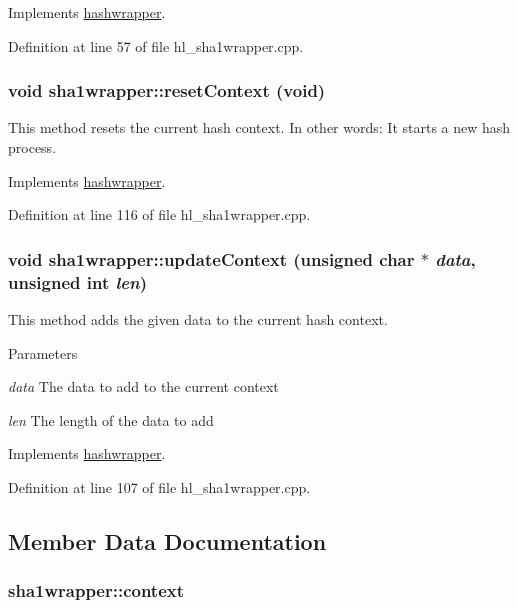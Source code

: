 Implements \hyperlink{classhashwrapper_a53f97c06885ed2b1fa255759a957a782}{hashwrapper}.

Definition at line 57 of file hl\_\-sha1wrapper.cpp.\hypertarget{classsha1wrapper_a8ab1d20a43a4768df03799a14cfbb6b6}{
\subsubsection[{resetContext}]{\setlength{\rightskip}{0pt plus 5cm}void sha1wrapper::resetContext (void)}}
\label{classsha1wrapper_a8ab1d20a43a4768df03799a14cfbb6b6}


This method resets the current hash context. In other words: It starts a new hash process. 

Implements \hyperlink{classhashwrapper_aa7d46e9630a794ff08cfb5307660a86d}{hashwrapper}.

Definition at line 116 of file hl\_\-sha1wrapper.cpp.\hypertarget{classsha1wrapper_af862f411a597be53682cbce6177e06e6}{
\subsubsection[{updateContext}]{\setlength{\rightskip}{0pt plus 5cm}void sha1wrapper::updateContext (unsigned char $\ast$ {\em data}, \/  unsigned int {\em len})}}
\label{classsha1wrapper_af862f411a597be53682cbce6177e06e6}


This method adds the given data to the current hash context. 
\begin{DoxyParams}{Parameters}
\item[{\em data}]The data to add to the current context \item[{\em len}]The length of the data to add \end{DoxyParams}


Implements \hyperlink{classhashwrapper_a7fe42ccf310e7d2cfe95f61732b73197}{hashwrapper}.

Definition at line 107 of file hl\_\-sha1wrapper.cpp.

\subsection{Member Data Documentation}
\hypertarget{classsha1wrapper_a7b9e5651faf4a23cf6fccebca11a801e}{
\subsubsection[{context}]{ {\bf sha1wrapper::context}}}
\label{classsha1wrapper_a7b9e5651faf4a23cf6fccebca11a801e}


